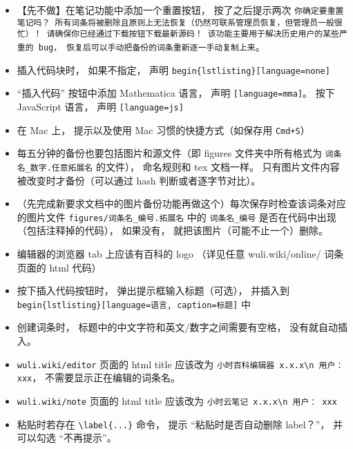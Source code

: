 \begin{itemize}
\item 【先不做】在笔记功能中添加一个重置按钮， 按了之后提示两次 \verb|你确定要重置笔记吗？ 所有词条将被删除且原则上无法恢复（仍然可联系管理员恢复，但管理员一般很忙）！ 请确保你已经通过下载按钮下载最新源码！ 该功能主要用于解决历史用户的某些严重的 bug， 恢复后可以手动把备份的词条重新逐一手动复制上来|。

\item 插入代码块时， 如果不指定， 声明 \verb`begin{lstlisting}[language=none]`

\item “插入代码” 按钮中添加 Mathematica 语言， 声明 \verb`[language=mma]`。 按下 JavaScript 语言， 声明 \verb|[language=js]|

\item 在 Mac 上， 提示以及使用 Mac 习惯的快捷方式（如保存用 \verb|Cmd+S|）

\item 每五分钟的备份也要包括图片和源文件（即 figures 文件夹中所有格式为 \verb|词条名_数字.任意拓展名| 的文件）， 命名规则和 tex 文档一样。 只有图片文件内容被改变时才备份（可以通过 hash 判断或者逐字节对比）。

\item （先完成新要求文档中的图片备份功能再做这个）每次保存时检查该词条对应的图片文件 \verb|figures/词条名_编号.拓展名| 中的 \verb|词条名_编号| 是否在代码中出现（包括注释掉的代码）， 如果没有， 就把该图片（可能不止一个）删除。

\item 编辑器的浏览器 tab 上应该有百科的 logo （详见任意 wuli.wiki/online/ 词条页面的 html 代码）

\item 按下插入代码按钮时， 弹出提示框输入标题（可选）， 并插入到 \verb|begin{lstlisting}[language=语言, caption=标题]| 中

\item 创建词条时， 标题中的中文字符和英文/数字之间需要有空格， 没有就自动插入。

\item \verb|wuli.wiki/editor| 页面的 html title 应该改为 \verb|小时百科编辑器 x.x.x\n 用户： xxx|， 不需要显示正在编辑的词条名。

\item \verb|wuli.wiki/note| 页面的 html title 应该改为 \verb|小时云笔记 x.x.x\n 用户： xxx|

\item 粘贴时若存在 \verb|\label{...}| 命令， 提示 “粘贴时是否自动删除 label？”， 并可以勾选 “不再提示”。


\end{itemize}
